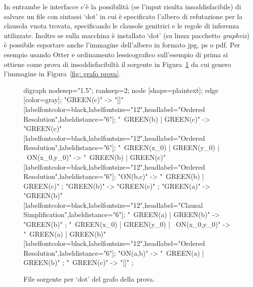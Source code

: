 \documentclass[a4paper,11pt]{article} %
\newenvironment{myfigure}[2]
  {\newcommand{\didascalia}{\caption{#1}}%
   \newcommand{\etichetta}{\label{#2}}%
   \begin{figure}[h!]\centering}
  {\didascalia\etichetta\end{figure}}
\begin{document}
In entrambe le interfacce c'è la possibilità (se l'input risulta insoddisfacibile)
di salvare un file con sintassi `dot' in cui è specificato l'albero %
di refutazione per la clausola vuota trovata,
specificando le clausole genitrici e le regole di inferenza utilizzate.
Inoltre se sulla macchina è installato `dot' (su linux pacchetto
\emph{graphviz}) è possibile esportare anche l'immagine dell'albero %
in formato jpg, ps o pdf. 
Per esempio usando Otter e ordinamento lessicografico sull'esempio di prima
si ottiene come prova di insoddisfacibiltà il sorgente in Figura~\ref{fig: src grafo prova} 
da cui genero l'immagine in Figura~\ref{fig: grafo prova}.
\begin{myfigure}{File sorgente per `dot' del grafo della prova.}{fig: src grafo prova}
\centering
\begin{dotgraph}
digraph {
	nodesep="1.5"; ranksep=2;
	node [shape=plaintext];
	edge [color=gray];
	"GREEN(c)" -> "[]" 
		[labelfontcolor=black,labelfontsize="12",headlabel="Ordered Resolution\n{ }",labeldistance="6"];
	"~GREEN(b) | GREEN(c)" -> "GREEN(c)" 
		[labelfontcolor=black,labelfontsize="12",headlabel="Ordered Resolution\n{ }",labeldistance="6"];
	"~GREEN(x_0) | GREEN(y_0) | ~ON(x_0,y_0)" -> "~GREEN(b) | GREEN(c)" 
		[labelfontcolor=black,labelfontsize="12",headlabel="Ordered Resolution",labeldistance="6"];
	"ON(b,c)" -> "~GREEN(b) | GREEN(c)" ;
	"GREEN(b)" -> "GREEN(c)" ;
	"GREEN(a)" -> "GREEN(b)" 
		[labelfontcolor=black,labelfontsize="12",headlabel="Clausal Simplification\n{ }",labeldistance="6"];
	"~GREEN(a) | GREEN(b)" -> "GREEN(b)" ;
	"~GREEN(x_0) | GREEN(y_0) | ~ON(x_0,y_0)" -> "~GREEN(a) | GREEN(b)" 
		[labelfontcolor=black,labelfontsize="12",headlabel="Ordered Resolution",labeldistance="6"];
	"ON(a,b)" -> "~GREEN(a) | GREEN(b)" ;
	"~GREEN(c)" -> "[]" ;
}
\end{dotgraph}
\end{myfigure}
\end{document}
